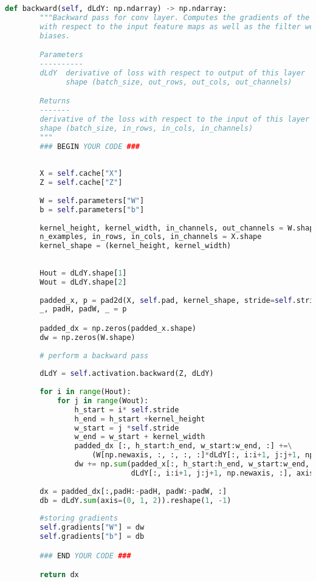 \begin{lstlisting}[language=Python]
    def backward(self, dLdY: np.ndarray) -> np.ndarray:
        """Backward pass for conv layer. Computes the gradients of the output
        with respect to the input feature maps as well as the filter weights and
        biases.

        Parameters
        ----------
        dLdY  derivative of loss with respect to output of this layer
              shape (batch_size, out_rows, out_cols, out_channels)

        Returns
        -------
        derivative of the loss with respect to the input of this layer
        shape (batch_size, in_rows, in_cols, in_channels)
        """
        ### BEGIN YOUR CODE ###
        
        
        X = self.cache["X"]
        Z = self.cache["Z"]
        
        W = self.parameters["W"]
        b = self.parameters["b"]
        
        kernel_height, kernel_width, in_channels, out_channels = W.shape
        n_examples, in_rows, in_cols, in_channels = X.shape
        kernel_shape = (kernel_height, kernel_width)
                
                
        Hout = dLdY.shape[1]
        Wout = dLdY.shape[2]
        
        padded_x, p = pad2d(X, self.pad, kernel_shape, stride=self.stride)
        _, padH, padW, _ = p

        padded_dx = np.zeros(padded_x.shape)
        dw = np.zeros(W.shape)    
        
        # perform a backward pass
        
        dLdY = self.activation.backward(Z, dLdY)
        
        for i in range(Hout):
            for j in range(Wout):
                h_start = i* self.stride
                h_end = h_start +kernel_height
                w_start = j *self.stride
                w_end = w_start + kernel_width
                padded_dx [:, h_start:h_end, w_start:w_end, :] +=\
                    (W[np.newaxis, :, :, :, :]*dLdY[:, i:i+1, j:j+1, np.newaxis, :]).sum(axis=4)
                dw += np.sum(padded_x[:, h_start:h_end, w_start:w_end, :, np.newaxis] *\
                             dLdY[:, i:i+1, j:j+1, np.newaxis, :], axis=0)
                    
        dx = padded_dx[:,padH:-padH, padW:-padW, :]
        db = dLdY.sum(axis=(0, 1, 2)).reshape(1, -1)
        
        #storing gradients
        self.gradients["W"] = dw
        self.gradients["b"] = db

        ### END YOUR CODE ###

        return dx

\end{lstlisting}


